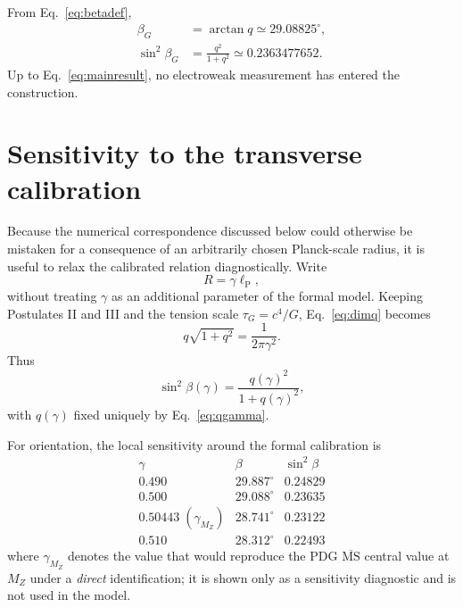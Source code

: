 \documentclass[aps,prd,reprint,nofootinbib,floatfix]{revtex4-2}
\begin{document}
From Eq.~\eqref{eq:betadef},
\begin{align}
\beta_G &= \arctan q \simeq 29.08825^\circ,\\
\boxed{\sin^2\beta_G} &= \boxed{\frac{q^2}{1+q^2}\simeq0.2363477652}.
\label{eq:mainresult}
\end{align}
Up to Eq.~\eqref{eq:mainresult}, no electroweak measurement has entered the construction.

\section{Sensitivity to the transverse calibration}

Because the numerical correspondence discussed below could otherwise be mistaken for a consequence of an arbitrarily chosen Planck-scale radius, it is useful to relax the calibrated relation diagnostically.  Write
\begin{equation}
R=\gamma\ell_{\mathrm P},
\label{eq:gamma}
\end{equation}
without treating $\gamma$ as an additional parameter of the formal model.  Keeping Postulates II and III and the tension scale $\tau_G=c^4/G$, Eq.~\eqref{eq:dimq} becomes
\begin{equation}
q\sqrt{1+q^2}=\frac{1}{2\pi\gamma^2}.
\label{eq:qgamma}
\end{equation}
Thus
\begin{equation}
\sin^2\beta(\gamma)=
\frac{q(\gamma)^2}{1+q(\gamma)^2},
\end{equation}
with $q(\gamma)$ fixed uniquely by Eq.~\eqref{eq:qgamma}.

For orientation, the local sensitivity around the formal calibration is
\begin{equation}
\begin{array}{c|c|c}
\gamma & \beta & \sin^2\beta \\
\hline
0.490 & 29.887^\circ & 0.24829 \\
0.500 & 29.088^\circ & 0.23635 \\
0.50443\;(\gamma_{M_Z}) & 28.741^\circ & 0.23122 \\
0.510 & 28.312^\circ & 0.22493
\end{array}
\label{eq:sensitivityarray}
\end{equation}
where $\gamma_{M_Z}$ denotes the value that would reproduce the PDG $\overline{\mathrm{MS}}$ central value at $M_Z$ under a \emph{direct} identification; it is shown only as a sensitivity diagnostic and is not used in the model.
\end{document}

